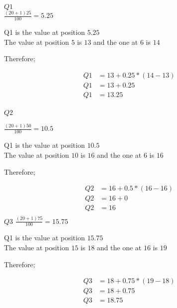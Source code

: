 $Q1$ \\
$\frac{(20 + 1)25}{100} = 5.25$

Q1 is the value at position $5.25$ \\
The value at position $5$ is $13$ and the one at $6$ is $14$

Therefore;

\begin{align*}
    Q1 & = 13 + 0.25 *(14 - 13) \\
    Q1 & = 13 + 0.25            \\
    Q1 & = 13.25                \\
\end{align*}

$Q2$

$\frac{(20 + 1)50}{100} = 10.5$

Q1 is the value at position $10.5$ \\
The value at position $10$ is $16$ and the one at $6$ is $16$

Therefore;

\begin{align*}
    Q2 & = 16 + 0.5 *(16 - 16) \\
    Q2 & = 16 + 0              \\
    Q2 & = 16                  \\
\end{align*}
$Q3$
$\frac{(20 + 1)75}{100} = 15.75$

Q1 is the value at position $15.75$ \\
The value at position $15$ is $18$ and the one at $16$ is $19$

Therefore;

\begin{align*}
    Q3 & = 18 + 0.75 *(19 - 18) \\
    Q3 & = 18 + 0.75            \\
    Q3 & = 18.75                \\
\end{align*}

\newpage
